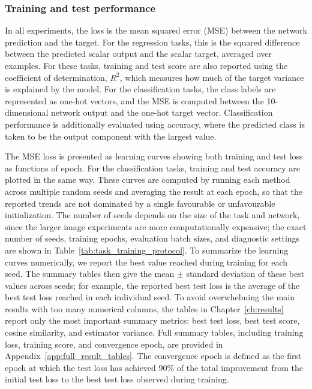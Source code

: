 \subsubsection{Training and test performance}

In all experiments, the loss is the mean squared error (MSE) between the network prediction and the target. For the regression tasks, this is the squared difference between the predicted scalar output and the scalar target, averaged over examples. For these tasks, training and test score are also reported using the coefficient of determination, \(R^2\), which measures how much of the target variance is explained by the model. For the classification tasks, the class labels are represented as one-hot vectors, and the MSE is computed between the 10-dimensional network output and the one-hot target vector. Classification performance is additionally evaluated using accuracy, where the predicted class is taken to be the output component with the largest value.

The MSE loss is presented as learning curves showing both training and test loss as functions of epoch. For the classification tasks, training and test accuracy are plotted in the same way. These curves are computed by running each method across multiple random seeds and averaging the result at each epoch, so that the reported trends are not dominated by a single favourable or unfavourable initialization. The number of seeds depends on the size of the task and network, since the larger image experiments are more computationally expensive; the exact number of seeds, training epochs, evaluation batch sizes, and diagnostic settings are shown in Table~\ref{tab:task_training_protocol}. To summarize the learning curves numerically, we report the best value reached during training for each seed. The summary tables then give the mean \(\pm\) standard deviation of these best values across seeds; for example, the reported best test loss is the average of the best test loss reached in each individual seed. To avoid overwhelming the main results with too many numerical columns, the tables in Chapter~\ref{ch:results} report only the most important summary metrics: best test loss, best test score, cosine similarity, and estimator variance. Full summary tables, including training loss, training score, and convergence epoch, are provided in Appendix~\ref{app:full_result_tables}. The convergence epoch is defined as the first epoch at which the test loss has achieved 90\% of the total improvement from the initial test loss to the best test loss observed during training.

